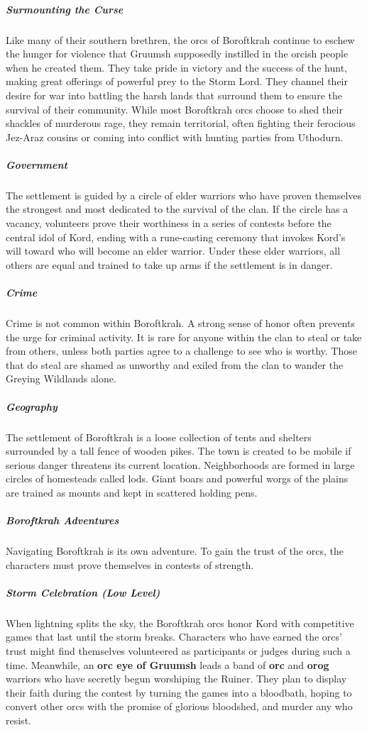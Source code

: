 \documentclass[10pt,a4paper,twoside,bg=print,twocolumn,openany,nodeprecatedcode]{dndbook}
\begin{document}
\subparagraph{Surmounting the Curse}
Like many of their southern brethren, the orcs of Boroftkrah continue to eschew the hunger for violence that Gruumsh supposedly instilled in the orcish people when he created them. They take pride in victory and the success of the hunt, making great offerings of powerful prey to the Storm Lord. They channel their desire for war into battling the harsh lands that surround them to ensure the survival of their community. While most Boroftkrah orcs choose to shed their shackles of murderous rage, they remain territorial, often fighting their ferocious Jez-Araz cousins or coming into conflict with hunting parties from Uthodurn.

\subparagraph{Government}
The settlement is guided by a circle of elder warriors who have proven themselves the strongest and most dedicated to the survival of the clan. If the circle has a vacancy, volunteers prove their worthiness in a series of contests before the central idol of Kord, ending with a rune-casting ceremony that invokes Kord's will toward who will become an elder warrior. Under these elder warriors, all others are equal and trained to take up arms if the settlement is in danger.

\subparagraph{Crime}
Crime is not common within Boroftkrah. A strong sense of honor often prevents the urge for criminal activity. It is rare for anyone within the clan to steal or take from others, unless both parties agree to a challenge to see who is worthy. Those that do steal are shamed as unworthy and exiled from the clan to wander the Greying Wildlands alone.

\subparagraph{Geography}
The settlement of Boroftkrah is a loose collection of tents and shelters surrounded by a tall fence of wooden pikes. The town is created to be mobile if serious danger threatens its current location. Neighborhoods are formed in large circles of homesteads called lods. Giant boars and powerful worgs of the plains are trained as mounts and kept in scattered holding pens.

\subparagraph{Boroftkrah Adventures}
Navigating Boroftkrah is its own adventure. To gain the trust of the orcs, the characters must prove themselves in contests of strength.

\subparagraph{Storm Celebration (Low Level)}
When lightning splits the sky, the Boroftkrah orcs honor Kord with competitive games that last until the storm breaks. Characters who have earned the orcs' trust might find themselves volunteered as participants or judges during such a time. Meanwhile, an \textbf{orc eye of Gruumsh} leads a band of \textbf{orc} and \textbf{orog} warriors who have secretly begun worshiping the Ruiner. They plan to display their faith during the contest by turning the games into a bloodbath, hoping to convert other orcs with the promise of glorious bloodshed, and murder any who resist.
\end{document}
